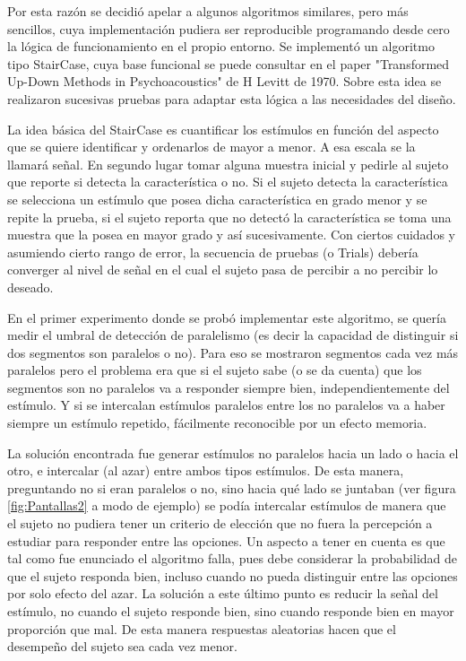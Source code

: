 \documentclass{article}
\numberwithin{figure}{section}
\begin{document}
    Por esta razón se decidió apelar a algunos algoritmos similares, pero más sencillos, cuya implementación pudiera ser reproducible programando desde cero la lógica de funcionamiento en el propio entorno. Se implementó un algoritmo tipo StairCase, cuya base funcional se puede consultar en el paper "Transformed Up-Down Methods in Psychoacoustics"\cite{staircase} de H Levitt de 1970. Sobre esta idea se realizaron sucesivas pruebas para adaptar esta lógica a las necesidades del diseño. 
    
    La idea básica del StairCase es cuantificar los estímulos en función del aspecto que se quiere identificar y ordenarlos de mayor a menor. A esa escala se la llamará señal. En segundo lugar tomar alguna muestra inicial y pedirle al sujeto que reporte si detecta la característica o no. Si el sujeto detecta la característica se selecciona un estímulo que posea dicha característica en grado menor y se repite la prueba, si el sujeto reporta que no detectó la característica se toma una muestra que la posea en mayor grado y así sucesivamente. Con ciertos cuidados y asumiendo cierto rango de error, la secuencia de pruebas (o Trials) debería converger al nivel de señal en el cual el sujeto pasa de percibir a no percibir lo deseado. 
    
    En el primer experimento donde se probó implementar este algoritmo, se quería medir el umbral de detección de paralelismo (es decir la capacidad de distinguir si dos segmentos son paralelos o no). Para eso se mostraron segmentos cada vez más paralelos pero el problema era que si el sujeto sabe (o se da cuenta) que los segmentos son no paralelos va a responder siempre bien, independientemente del estímulo. Y si se intercalan estímulos paralelos entre los no paralelos va a haber siempre un estímulo repetido, fácilmente reconocible por un efecto memoria. 
    
    La solución encontrada fue generar estímulos no paralelos hacia un lado o hacia el otro, e intercalar (al azar) entre ambos tipos estímulos. De esta manera, preguntando no si eran paralelos o no, sino hacia qué lado se juntaban (ver figura \ref{fig:Pantallas2} a modo de ejemplo) se podía intercalar estímulos de manera que el sujeto no pudiera tener un criterio de elección que no fuera la percepción a estudiar para responder entre las opciones. Un aspecto a tener en cuenta es que tal como fue enunciado el algoritmo falla, pues debe considerar la probabilidad de que el sujeto responda bien, incluso cuando no pueda distinguir entre las opciones por solo efecto del azar. La solución a este último punto es reducir la señal del estímulo, no cuando el sujeto responde bien, sino cuando responde bien en mayor proporción que mal. De esta manera respuestas aleatorias hacen que el desempeño del sujeto sea cada vez menor. 
    
\end{document}
